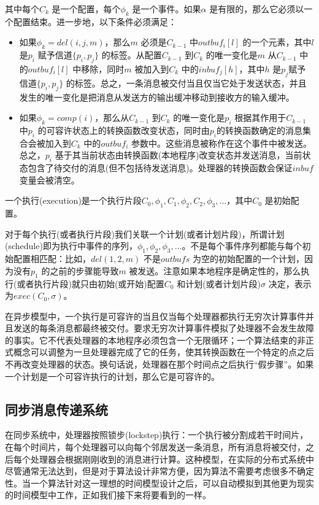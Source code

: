     其中每个$C_k$ 是一个配置，每个$\phi_k$ 是一个事件。如果$\alpha$ 是有限的，那么它必须以一个配置结束。进一步地，以下条件必须满足：
    \begin{itemize}
      \item 如果$\phi_k=del(i,j,m)$，那么$m$ 必须是$C_{k-1}$ 中$outbuf_i[l]$ 的一个元素，其中$l$ 是$p_i$ 赋予信道$\{p_i,p_j\}$ 的标签。从配置$C_{k-1}$ 到$C_k$ 的唯一变化是$m$ 从$C_{k-1}$ 中的$outbuf_i[l]$ 中移除，同时$m$ 被加入到$C_k$ 中的$inbuf_j[h]$，其中$h$ 是$p_j$赋予信道$\{p_i,p_j\}$ 的标签。总之，一条消息被交付当且仅当它处于发送状态，并且发生的唯一变化是把消息从发送方的输出缓冲移动到接收方的输入缓冲。
      \item 如果$\phi_k=comp(i)$，那么从$C_{k-1}$ 到$C_k$ 的唯一变化是$p_i$ 根据其作用于$C_{k-1}$ 中$p_i$ 的可容许状态上的转换函数改变状态，同时由$p_i$的转换函数确定的消息集合会被加入到$C_k$ 中的$outbuf_i$ 参数中。这些消息被称作在这个事件中被发送。总之，$p_i$ 基于其当前状态由转换函数(本地程序)改变状态并发送消息，当前状态包含了待交付的消息(但不包括待发送消息)。处理器的转换函数会保证$inbuf$ 变量会被清空。
    \end{itemize}

    一个执行(execution)是一个执行片段$C_0,\phi_1,C_1,\phi_2,C_2,\phi_3,...$，其中$C_0$ 是初始配置。

    对于每个执行(或者执行片段)我们关联一个计划(或者计划片段)，所谓计划(schedule)即为执行中事件的序列，$\phi_1,\phi_2,\phi_3,...$。不是每个事件序列都能与每个初始配置相匹配：比如，$del(1,2,m)$ 不是$outbufs$ 为空的初始配置的一个计划，因为没有$p_1$ 的之前的步骤能导致$m$ 被发送。注意如果本地程序是确定性的，那么执行(或者执行片段)就只由初始(或开始)配置$C_0$ 和计划(或者计划片段)$\sigma$ 决定，表示为$exec(C_0,\sigma)$。

    在异步模型中，一个执行是可容许的当且仅当每个处理器都执行无穷次计算事件并且发送的每条消息都最终被交付。要求无穷次计算事件模拟了处理器不会发生故障的事实。它不代表处理器的本地程序必须包含一个无限循环；一个算法结束的非正式概念可以调整为一旦处理器完成了它的任务，使其转换函数在一个特定的点之后不再改变处理器的状态。换句话说，处理器在那个时间点之后执行“假步骤”。如果一个计划是一个可容许执行的计划，那么它是可容许的。

    \subsection{同步消息传递系统}
    在同步系统中，处理器按照锁步(lockstep)执行：一个执行被分割成若干时间片，在每个时间片，每个处理器可以向每个邻居发送一条消息，所有消息将被交付，之后每个处理器会根据刚刚收到的消息进行计算。这种模型，在实际的分布式系统中尽管通常无法达到，但是对于算法设计非常方便，因为算法不需要考虑很多不确定性。当一个算法针对这一理想的时间模型设计之后，可以自动模拟到其他更为现实的时间模型中工作，正如我们接下来将要看到的一样。

